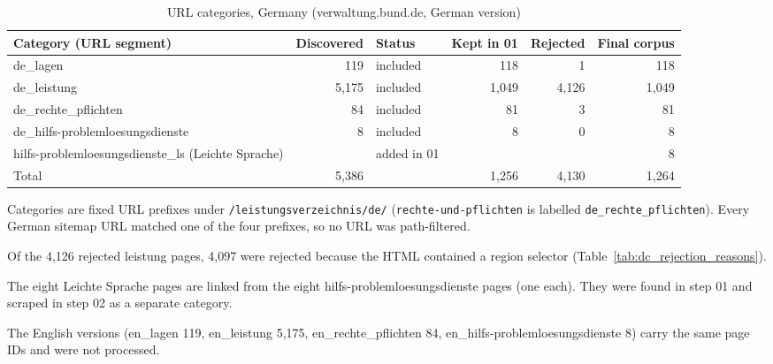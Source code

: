 \begin{table}[htbp]
\centering
\small
\begin{threeparttable}
\caption{URL categories, Germany (verwaltung.bund.de, German version)}
\label{tab:dc_categories_germany}
\begin{tabular}{lrlrrr}
\hline
Category (URL segment) & Discovered & Status & Kept in 01 & Rejected & Final corpus \\
\hline
de\_lagen & 119 & included & 118 & 1 & 118 \\
de\_leistung & 5,175 & included & 1,049 & 4,126 & 1,049 \\
de\_rechte\_pflichten & 84 & included & 81 & 3 & 81 \\
de\_hilfs-problemloesungsdienste & 8 & included & 8 & 0 & 8 \\
hilfs-problemloesungsdienste\_ls (Leichte Sprache) &  & added in 01 &  &  & 8 \\
\hline
Total & 5,386 &  & 1,256 & 4,130 & 1,264 \\
\hline
\end{tabular}
\begin{tablenotes}
\footnotesize
\item Categories are fixed URL prefixes under \texttt{/leistungsverzeichnis/de/} (\texttt{rechte-und-pflichten} is labelled \texttt{de\_rechte\_pflichten}). Every German sitemap URL matched one of the four prefixes, so no URL was path-filtered.
\item Of the 4,126 rejected leistung pages, 4,097 were rejected because the HTML contained a region selector (Table~\ref{tab:dc_rejection_reasons}).
\item The eight Leichte Sprache pages are linked from the eight hilfs-problemloesungsdienste pages (one each). They were found in step 01 and scraped in step 02 as a separate category.
\item The English versions (en\_lagen 119, en\_leistung 5,175, en\_rechte\_pflichten 84, en\_hilfs-problemloesungsdienste 8) carry the same page IDs and were not processed.
\end{tablenotes}
\end{threeparttable}
\end{table}
